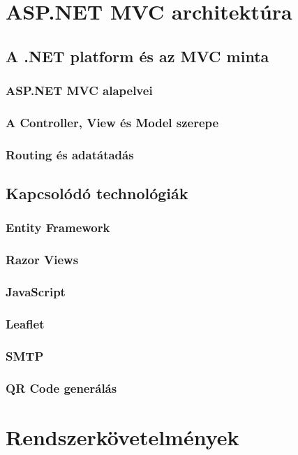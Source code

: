 \section{ASP.NET MVC architektúra}

\subsection{A .NET platform és az MVC minta}
\subsubsection{ASP.NET MVC alapelvei}
\subsubsection{A Controller, View és Model szerepe}
\subsubsection{Routing és adatátadás}

\subsection{Kapcsolódó technológiák}
\subsubsection{Entity Framework}
\subsubsection{Razor Views}
\subsubsection{JavaScript}
\subsubsection{Leaflet}
\subsubsection{SMTP}
\subsubsection{QR Code generálás}


\section{Rendszerkövetelmények}

